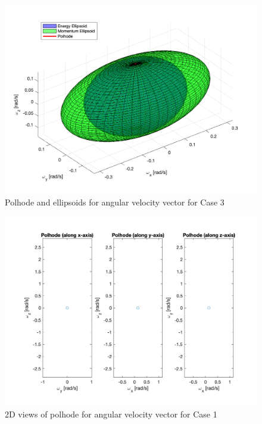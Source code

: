 \begin{figure}[H]
\centering
\includegraphics[scale=0.6]{Images/ps2_problem9_p7_z.png}
\caption{Polhode and ellipsoids for angular velocity vector for Case 3}
\label{fig:ps2_problem9_p7_z}
\end{figure}

\begin{figure}[H]
\centering
\includegraphics[scale=0.6]{Images/ps2_problem9_p8_x.png}
\caption{2D views of polhode for angular velocity vector for Case 1}
\label{fig:ps2_problem9_p8_x}
\end{figure}

